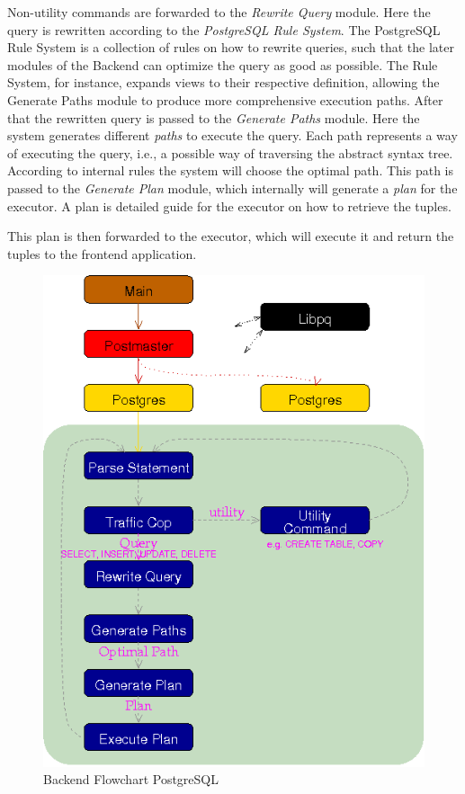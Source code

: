 Non-utility commands are forwarded to the \emph{Rewrite Query} module.
%
Here the query is rewritten according to the \emph{PostgreSQL Rule System}.
%
The PostgreSQL Rule System is a collection of rules on how to rewrite queries, such that the later modules of the Backend can optimize the query as good as possible.
The Rule System, for instance, expands views to their respective definition, allowing the Generate Paths module to produce more comprehensive execution paths.
%
After that the rewritten query is passed to the \emph{Generate Paths} module.
%
Here the system generates different \emph{paths} to execute the query.
%
Each path represents a way of executing the query, i.e., a possible way of traversing the abstract syntax tree.
%
According to internal rules the system will choose the optimal path.
%
This path is passed to the \emph{Generate Plan} module, which internally will generate a \emph{plan} for the executor.
%
A plan is detailed guide for the executor on how to retrieve the tuples.

This plan is then forwarded to the executor, which will execute it and return the tuples to the frontend application.
%
\begin{figure}[!ht]
  \centering
    \includegraphics[width=1\textwidth]{img/backend_flowchart.png}
    \caption{Backend Flowchart PostgreSQL \protect \footnotemark}\label{figure:postgresql:architecture}
\end{figure}
%
